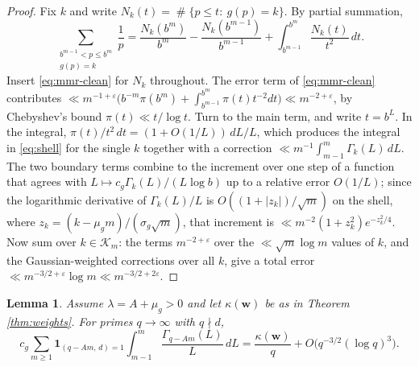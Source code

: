 \documentclass[11pt,reqno]{amsart}
\theoremstyle{plain}
\newtheorem{lemma}[theorem]{Lemma}
\theoremstyle{definition}
\DeclareMathOperator{\Card}{\#}
\begin{document}
\begin{proof}
Fix $k$ and write $N_k(t)=\Card\{p\le t:\ g(p)=k\}$. By partial summation,
\[
\sum_{\substack{b^{m-1}<p\le b^{m}\\ g(p)=k}}\frac1p
=\frac{N_k(b^{m})}{b^{m}}-\frac{N_k(b^{m-1})}{b^{m-1}}+\int_{b^{m-1}}^{b^{m}}\frac{N_k(t)}{t^{2}}\,dt .
\]
Insert \eqref{eq:mmr-clean} for $N_k$ throughout. The error term of \eqref{eq:mmr-clean} contributes $\ll m^{-1+\varepsilon}\big(b^{-m}\pi(b^m)+\int_{b^{m-1}}^{b^m}\pi(t)t^{-2}dt\big)\ll m^{-2+\varepsilon}$, by Chebyshev's bound $\pi(t)\ll t/\log t$. Turn to the main term, and write $t=b^{L}$. In the integral, $\pi(t)/t^{2}\,dt=(1+O(1/L))\,dL/L$, which produces the integral in \eqref{eq:shell} for the single $k$ together with a correction $\ll m^{-1}\int_{m-1}^m\Gamma_k(L)\,dL$. The two boundary terms combine to the increment over one step of a function that agrees with $L\mapsto c_g\Gamma_k(L)/(L\log b)$ up to a relative error $O(1/L)$; since the logarithmic derivative of $\Gamma_k(L)/L$ is $O((1+|z_k|)/\sqrt m)$ on the shell, where $z_k=(k-\mu_gm)/(\sigma_g\sqrt m)$, that increment is $\ll m^{-2}(1+z_k^{2})e^{-z_k^{2}/4}$. Now sum over $k\in\mathcal K_m$: the terms $m^{-2+\varepsilon}$ over the $\ll\sqrt m\log m$ values of $k$, and the Gaussian-weighted corrections over all $k$, give a total error $\ll m^{-3/2+\varepsilon}\log m\ll m^{-3/2+2\varepsilon}$.
\end{proof}

\begin{lemma}\label{lem:saddle}
Assume $\lambda=A+\mu_g>0$ and let $\kappa(\mathbf w)$ be as in Theorem \ref{thm:weights}. For primes $q\to\infty$ with $q\nmid d$,
\begin{equation}\label{eq:saddle}
c_g\sum_{m\ge1}\mathbf 1_{(q-Am,\,d)=1}
\int_{m-1}^{m}\frac{\Gamma_{q-Am}(L)}{L}\,dL
=\frac{\kappa(\mathbf w)}q+O\big(q^{-3/2}(\log q)^{3}\big).
\end{equation}
\end{lemma}
\end{document}
